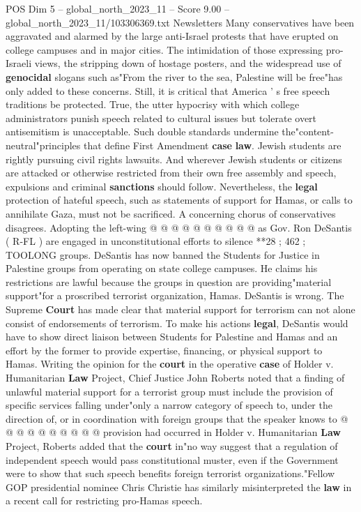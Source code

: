 \begin{textsample}{POS Dim 5 – global\_north\_2023\_11 – Score 9.00 – global\_north\_2023\_11/103306369.txt}  \label{ex:f5_pos_417}
Newsletters Many conservatives have been aggravated and alarmed by the large anti-Israel protests that have erupted on college campuses and in major cities.
The intimidation of those expressing pro-Israeli views, the stripping down of hostage posters, and the widespread use of \textbf{genocidal} slogans such as"From the river to the sea, Palestine will be free"has only added to these concerns.
Still, it is critical that America ' s free speech traditions be protected.
True, the utter hypocrisy with which college administrators punish speech related to cultural issues but tolerate overt antisemitism is unacceptable.
Such double standards undermine the"content-neutral"principles that define First Amendment \textbf{case} \textbf{law}.
Jewish students are rightly pursuing civil rights lawsuits.
And wherever Jewish students or citizens are attacked or otherwise restricted from their own free assembly and speech, expulsions and criminal \textbf{sanctions} should follow.
Nevertheless, the \textbf{legal} protection of hateful speech, such as statements of support for Hamas, or calls to annihilate Gaza, must not be sacrificed.
A concerning chorus of conservatives disagrees.
Adopting the left-wing @ @ @ @ @ @ @ @ @ @ as Gov.
Ron DeSantis ( R-FL ) are engaged in unconstitutional efforts to silence **28 ; 462 ; TOOLONG groups.
DeSantis has now banned the Students for Justice in Palestine groups from operating on state college campuses.
He claims his restrictions are lawful because the groups in question are providing"material support"for a proscribed terrorist organization, Hamas.
DeSantis is wrong.
The Supreme \textbf{Court} has made clear that material support for terrorism can not alone consist of endorsements of terrorism.
To make his actions \textbf{legal}, DeSantis would have to show direct liaison between Students for Palestine and Hamas and an effort by the former to provide expertise, financing, or physical support to Hamas.
Writing the opinion for the \textbf{court} in the operative \textbf{case} of Holder v.
Humanitarian \textbf{Law} Project, Chief Justice John Roberts noted that a finding of unlawful material support for a terrorist group must include the provision of specific services falling under"only a narrow category of speech to, under the direction of, or in coordination with foreign groups that the speaker knows to @ @ @ @ @ @ @ @ @ @ provision had occurred in Holder v.
Humanitarian \textbf{Law} Project, Roberts added that the \textbf{court} in"no way suggest that a regulation of independent speech would pass constitutional muster, even if the Government were to show that such speech benefits foreign terrorist organizations."Fellow GOP presidential nominee Chris Christie has similarly misinterpreted the \textbf{law} in a recent call for restricting pro-Hamas speech.

\end{textsample}
